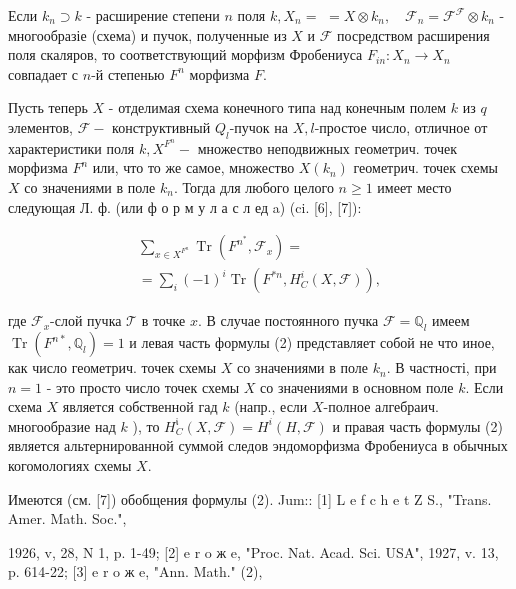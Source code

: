 \documentclass[10pt]{article}
\begin{document}
Если $k_{n} \supset k$ - расширение степени $n$ поля $k, X_{n}=$ $=X \otimes k_{n}, \quad \mathscr{F}_{n}=\mathcal{F}^{\mathcal{F}} \otimes k_{n}$ - многообразіе (схема) и пучок, полученные из $X$ и $\mathscr{F}$ посредством расширения поля скаляров, то соответствующий морфизм Фробениуса $F_{i n}: X_{n} \rightarrow X_{n}$ совпадает с $n$-й степенью $F^{n}$ морфизма $F$.



Пусть теперь $X$ - отделимая схема конечного типа над конечным полем $k$ из $q$ элементов, $\mathcal{F}-$ конструктивный $Q_{l}$-пучок на $X, l$-простое число, отличное от характеристики поля $k, X^{F^{n}}-$ множество неподвижных геометрич. точек морфизма $F^{n}$ или, что то же самое, множество $X\left(k_{n}\right)$ геометрич. точек схемы $X$ со значениями в поле $k_{n}$. Тогда для любого целого $n \geqslant 1$ имеет место следующая Л. ф. (или ф о р м у л а с л ед a) (ci. [6], [7]):



\[

\begin{gathered}

\sum_{x \in X^{F^{n}}} \operatorname{Tr}\left(F^{n^{*}}, \mathscr{F}_{x}\right)= \\

=\sum_{i}(-1)^{i} \operatorname{Tr}\left(F^{* n}, H_{C}^{i}(X, \mathscr{F})\right),

\end{gathered}

\]



где $\mathcal{F}_{x}$-слой пучка $\mathscr{T}$ в точке $x$. В случае постоянного пучка $\mathcal{F}=\mathbb{Q}_{l}$ имеем $\operatorname{Tr}\left(F^{n *}, \mathbb{Q}_{l}\right)=1$ и левая часть формулы (2) представляет собой не что иное, как число геометрич. точек схемы $X$ со значениями в поле $k_{n}$. В частності, при $n=1$ - это просто число точек схемы $X$ со значениями в основном поле $k$. Если схема $X$ является собственной гад $k$ (напр., если $X$-полное алгебраич. многообразие над $k$ ), то $H_{C}^{\mathfrak{i}}(X, \mathscr{F})=H^{i}(H, \mathscr{F})$ и правая часть формулы (2) является альтернированной суммой следов эндоморфизма Фробениуса в обычных когомологиях схемы $X$.



Имеются (см. [7]) обобщения формулы (2). Jum:: [1] L e f c h e t Z S., "Trans. Amer. Math. Soc.",

1926, v, 28, N 1, p. 1-49; [2] e r o ж e, "Proc. Nat. Acad. Sci. USA", 1927, v. 13, p. 614-22; [3] e r o ж e, "Ann. Math." (2),
\end{document}
